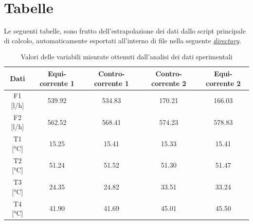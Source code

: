 \documentclass[a4paper,10pt]{article}                                                                                       %
\begin{document}
\section{Tabelle}                                                                                                           %
\label{sec:tables}                                                                                                          %
  Le seguenti tabelle, sono frutto dell'estrapolazione dei dati dallo script principale di calcolo, automaticamente
  esportati all'interno di file nella seguente
  \textit{\href{https://github.com/CristianMerli/DataAnalysis/tree/master/final_doc/code_exports/output}{directory}}.
\begin{table}[H]                                                                                                            %
  \caption{Valori delle variabili misurate ottenuti dall'analisi dei dati sperimentali}                                     %
  \label{tab:measures_data}                                                                                                 %
  \vspace{3mm}                                                                                                              %
  \centering                                                                                                                %
  \begin{tabular}{||c|c|c|c|c||}                                                                                            %
    \hline
    Dati      & Equi-corrente 1 & Contro-corrente 1 & Contro-corrente 2 & Equi-corrente 2 \\
    \hline\hline
    F1 [l/h]  & 539.92          & 534.83            & 170.21            & 166.03          \\
    F2 [l/h]  & 562.52          & 568.41            & 574.23            & 578.83          \\
    T1 [°C]   & 15.25           & 15.41             & 15.33             & 15.41           \\
    T2 [°C]   & 51.24           & 51.52             & 51.30             & 51.47           \\
    T3 [°C]   & 24.35           & 24.82             & 33.51             & 33.24           \\
    T4 [°C]   & 41.90           & 41.69             & 45.01             & 45.50           \\
    \hline
  \end{tabular}                                                                                                             %
\end{table}                                                                                                                 %
\end{document}
